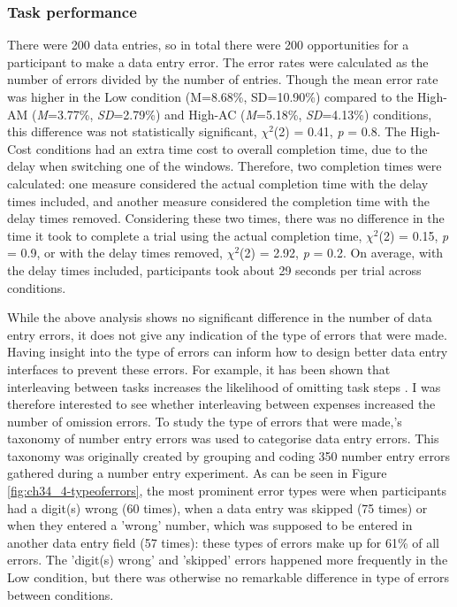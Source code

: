 \subsubsection{Task performance}
There were 200 data entries, so in total there were 200 opportunities for a participant to make a data entry error. The error rates were calculated as the number of errors divided by the number of entries. Though the mean error rate was higher in the Low condition (M=8.68\%, SD=10.90\%) compared to the High-AM (\textit{M}=3.77\%, \textit{SD}=2.79\%) and High-AC (\textit{M}=5.18\%, \textit{SD}=4.13\%) conditions, this difference was not statistically significant, $\chi^2$(2) = 0.41, \textit{p} = 0.8. 
The High-Cost conditions had an extra time cost to overall completion time, due to the delay when switching one of the windows. Therefore, two completion times were calculated: one measure considered the actual completion time with the delay times included, and another measure considered the completion time with the delay times removed. Considering these two times, there was no difference in the time it took to complete a trial using the actual completion time,  $\chi^2$(2) = 0.15, \textit{p} = 0.9, or with the delay times removed,  $\chi^2$(2) = 2.92, \textit{p} = 0.2. On average, with the delay times included, participants took about 29 seconds per trial across conditions.

While the above analysis shows no significant difference in the number of data entry errors, it does not give any indication of the type of errors that were made. Having insight into the type of errors can inform how to design better data entry interfaces to prevent these errors\citep{Wiseman2011}. For example, it has been shown that interleaving between tasks increases the likelihood of omitting task steps \citep{Back2012}. I was therefore interested to see whether interleaving between expenses increased the number of omission errors. To study the type of errors that were made,\citeauthor{Wiseman2011}'s \citeyearpar{Wiseman2011} taxonomy of number entry errors was used to categorise data entry errors. This taxonomy was originally created by grouping and coding 350 number entry errors gathered during a number entry experiment. As can be seen in Figure \ref{fig:ch34_4-typeoferrors}, the most prominent error types were when participants had a digit(s) wrong (60 times), when a data entry was skipped (75 times) or when they entered a 'wrong' number, which was supposed to be entered in another data entry field (57 times): these types of errors make up for 61\% of all errors. The 'digit(s) wrong' and 'skipped' errors happened more frequently in the Low condition, but there was otherwise no remarkable difference in type of errors between conditions. 

